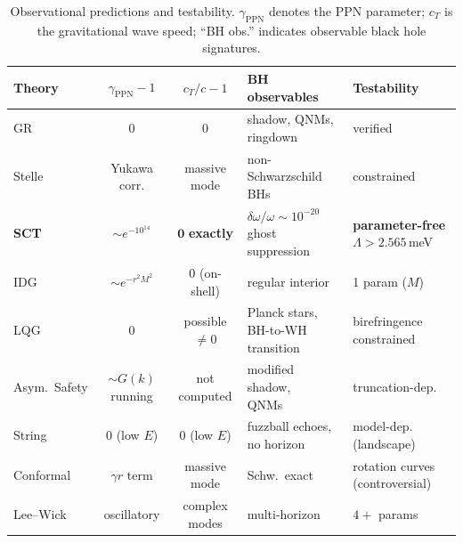 \begin{table}[p]
\centering
\caption{Observational predictions and testability.
  $\gamma_{\mathrm{PPN}}$ denotes the PPN parameter;
  $c_T$ is the gravitational wave speed;
  ``BH obs.'' indicates observable black hole signatures.}
\label{tab:qg_obs}
\small
\renewcommand{\arraystretch}{1.25}
\begin{adjustbox}{max width=\textwidth}
\begin{tabular}{@{} l c c l l @{}}
\toprule
\textbf{Theory}
  & \textbf{$\gamma_{\mathrm{PPN}} - 1$}
  & \textbf{$c_T/c - 1$}
  & \textbf{BH observables}
  & \textbf{Testability}\\
\midrule

GR
  & $0$
  & $0$
  & shadow, QNMs, ringdown
  & \textcolor{resolved}{verified}\\

Stelle
  & Yukawa corr.
  & massive mode
  & non-Schwarzschild BHs
  & constrained\\

\textbf{SCT}
  & $\sim e^{-10^{14}}$
  & $\mathbf{0}$ \textbf{exactly}
  & \makecell[l]{$\delta\omega/\omega \sim 10^{-20}$\\ghost suppression}
  & \makecell[l]{\textbf{parameter-free}\\$\Lambda > 2.565\,$meV}\\

IDG
  & $\sim e^{-r^2 M^2}$
  & $0$ (on-shell)
  & regular interior
  & 1 param ($M$)\\

LQG
  & $0$
  & possible $\neq 0$
  & \makecell[l]{Planck stars,\\BH-to-WH transition}
  & \makecell[l]{birefringence\\constrained}\\

Asym.\ Safety
  & $\sim G(k)$ running
  & not computed
  & \makecell[l]{modified shadow,\\QNMs}
  & truncation-dep.\\

String
  & $0$ (low $E$)
  & $0$ (low $E$)
  & \makecell[l]{fuzzball echoes,\\no horizon}
  & \makecell[l]{model-dep.\\(landscape)}\\

Conformal
  & $\gamma r$ term
  & massive mode
  & Schw.\ exact
  & \makecell[l]{rotation curves\\(controversial)}\\

Lee--Wick
  & oscillatory
  & complex modes
  & multi-horizon
  & $4{+}$ params\\

\bottomrule
\end{tabular}
\end{adjustbox}
\end{table}


